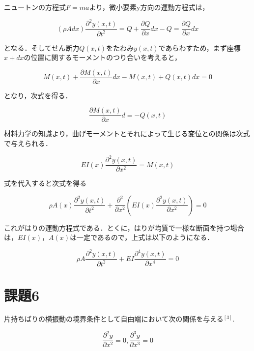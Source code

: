 \documentclass[twocolumn,xelatex,ja=standard,jafont=noto]{bxjsarticle}
\begin{document}
ニュートンの方程式$ F=ma $より，微小要素y方向の運動方程式は，

\begin{equation}
			(\rho Adx)\frac{\partial^{2}y(x,t)}{\partial t^{2}}=Q+\frac{\partial Q}{\partial x}dx-Q=\frac{\partial Q}{\partial x}dx
\end{equation}

となる．そしてせん断力$ Q(x,t) $をたわみ$ y(x,t) $であらわすため，まず座標$ x+dx $の位置に関するモーメントのつり合いを考えると，


\begin{equation}
			M(x,t)+\frac{\partial M(x,t)}{\partial x}dx-M(x,t)+Q(x,t)dx=0
\end{equation}

となり，次式を得る．


\begin{equation}
			\frac{\partial M(x,t)}{\partial x}d=-Q(x,t)
\end{equation}


材料力学の知識より，曲げモーメントとそれによって生じる変位との関係は次式で与えられる．


\begin{equation}
			EI(x)\frac{{\partial^{2}y(x,t)}}{\partial x^{2}}=M(x,t)
\end{equation}


式を代入すると次式を得る


\begin{equation}
			\rho A(x)\frac{\partial^{2}y(x,t)}{\partial t^{2}}+\frac{\partial^{2}}{\partial x^{2}} (EI(x)\frac{\partial^{2}y(x,t)}{\partial x^{2}})=0
\end{equation}


これがはりの運動方程式である．とくに，はりが均質で一様な断面を持つ場合は，$ EI(x)，A(x) $は一定であるので，上式は以下のようになる．


\begin{equation}
			\rho A\frac{\partial^{2}y(x,t)}{\partial t^{2}}+EI\frac{\partial^{4}y(x,t)}{\partial x^{4}}=0
\end{equation}


\newpage



\section{課題6}
片持ちばりの横振動の境界条件として自由端において次の関係を与える$ ^{[3]} $.



\begin{equation}
			\frac{\partial^{2}y}{\partial x^{2}}=0, \frac{\partial^{3}y}{\partial x^{3}}=0
\end{equation}\\
\end{document}
